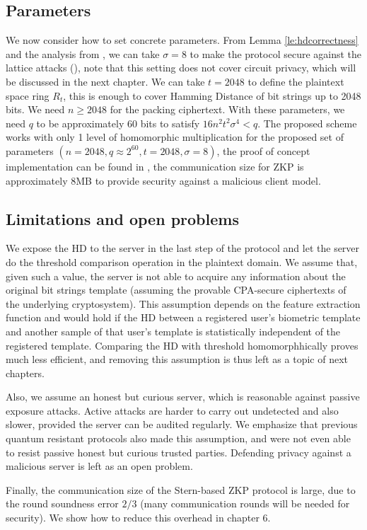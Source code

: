 \subsection{Parameters}
\label{sec:parameters}
We now consider how to set concrete parameters. From Lemma
\ref{le:hdcorrectness} and the analysis from \cite{naehrig2011can}, we can take
\(\sigma = 8\) to make the protocol secure against the lattice attacks
(\cite{micciancio2008lattice}), note that this setting does not cover circuit
privacy, which will be discussed in the next chapter. We can take \(t = 2048\)
to define the plaintext space ring \(R_{t}\), this is enough to cover Hamming
Distance of bit strings up to 2048 bits. We need \(n \geq 2048\) for the packing
ciphertext. With these parameters, we need \(q\) to be approximately 60 bits to
satisfy \(16n^{2}t^{2}\sigma^{4} < q\).  The proposed scheme works with only 1
level of homomorphic multiplication for the proposed set of parameters
$(n = 2048, q \approx 2^{60}, t = 2048, \sigma = 8)$, the proof of concept
implementation can be found in \cite{rimrimrq38:online}, the communication size for
ZKP is approximately 8MB to provide security against a malicious client model.

\subsection{Limitations and open problems}
\label{sec:limitations}
We expose the HD to the server in the last step of the protocol and let the
server do the threshold comparison operation in the plaintext domain. We assume
that, given such a value, the server is not able to acquire any
information about the original bit strings template (assuming the provable
CPA-secure ciphertexts of the underlying cryptosystem). This assumption depends on the feature extraction function and would hold if the HD between a registered user's biometric template and another sample of that user's template is statistically independent of the registered template. Comparing the HD with threshold
homomorphhically proves much less efficient, and removing this assumption is
thus left as a topic of next chapters.

Also, we assume an honest but curious server, which is reasonable against
passive exposure attacks. Active attacks are harder to carry out undetected and
also slower, provided the server can be audited regularly. We emphasize that
previous quantum resistant protocols also made this assumption, and were not
even able to resist passive honest but curious trusted parties. Defending
privacy against a malicious server is left as an open problem.

Finally, the communication size of the Stern-based ZKP protocol is large, due to
the round soundness error \(2/3\) (many communication rounds will be needed for
security). We show how to reduce this overhead in chapter 6.

